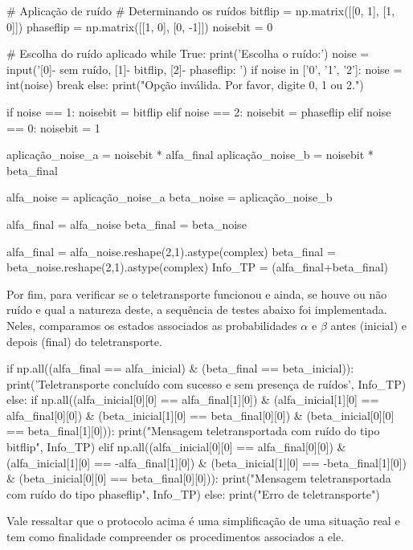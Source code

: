 \begin{pycode}
    # Aplicação de ruído
    # Determinando os ruídos
    bitflip = np.matrix([[0, 1], [1, 0]])
    phaseflip = np.matrix([[1, 0], [0, -1]])
    noisebit = 0

    # Escolha do ruído aplicado
    while True:
        print('Escolha o ruído:')
        noise = input('[0]- sem ruído, [1]- bitflip, [2]- phaseflip: ')
        if noise in ['0', '1', '2']:
            noise = int(noise)
            break
        else:
            print("Opção inválida. Por favor, digite 0, 1 ou 2.")

    if noise == 1:
        noisebit = bitflip
    elif noise == 2:
        noisebit = phaseflip
    elif noise == 0:
        noisebit = 1

    aplicação_noise_a = noisebit * alfa_final
    aplicação_noise_b = noisebit * beta_final

    alfa_noise = aplicação_noise_a
    beta_noise = aplicação_noise_b

    alfa_final = alfa_noise
    beta_final = beta_noise
    
    alfa_final = alfa_noise.reshape(2,1).astype(complex)
	beta_final = beta_noise.reshape(2,1).astype(complex)
	Info_TP = (alfa_final+beta_final)
\end{pycode}

Por fim, para verificar se o teletransporte funcionou e ainda, se houve ou não ruído e qual a natureza deste, a sequência de testes abaixo foi implementada. Neles, comparamos os estados associados as probabilidades \(\alpha\) e \(\beta\) antes (inicial) e depois (final) do teletransporte.

\begin{pycode}
    if np.all((alfa_final == alfa_inicial) & (beta_final == beta_inicial)):
        print('Teletransporte concluído com sucesso e sem presença de ruídos', Info_TP)
    else:
        if np.all((alfa_inicial[0][0] == alfa_final[1][0]) &
                    (alfa_inicial[1][0] == alfa_final[0][0]) &
                    (beta_inicial[1][0] == beta_final[0][0]) &
                    (beta_inicial[0][0] == beta_final[1][0])):
            print("Mensagem teletransportada com ruído do tipo bitflip", Info_TP)
        elif np.all((alfa_inicial[0][0] == alfa_final[0][0]) &
                    (alfa_inicial[1][0] == -alfa_final[1][0]) &
                    (beta_inicial[1][0] == -beta_final[1][0]) &
                    (beta_inicial[0][0] == beta_final[0][0])):
            print("Mensagem teletransportada com ruído do tipo phaseflip", Info_TP)
        else:
            print("Erro de teletransporte")
\end{pycode}

Vale ressaltar que o protocolo acima é uma simplificação de uma situação real e tem como finalidade compreender os procedimentos associados a ele.
